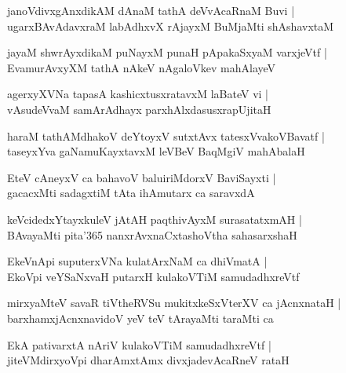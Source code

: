\documentclass[twoside,12pt,openright]{book}
\newcounter{shloka}[chapter]
\begin{document}
\begin{shloka}%
janoVdivxgAnxdikAM dAnaM tathA deVvAcaRnaM Buvi |\\
ugarxBAvAdavxraM labAdhxvX rAjayxM BuMjaMti shAshavxtaM 
\end{shloka}

\begin{shloka}%
jayaM shwrAyxdikaM puNayxM punaH pApakaSxyaM varxjeVtf |\\
EvamurAvxyXM tathA nAkeV nAgaloVkev mahAlayeV 
\end{shloka}

\begin{shloka}%
agerxyXVNa tapasA kashicxtusxratavxM laBateV vi |\\
vAsudeVvaM samArAdhayx parxhAlxdasusxrapUjitaH 
\end{shloka}

\begin{shloka}%
haraM tathAMdhakoV deYtoyxV sutxtAvx tatesxVvakoVBavatf |\\
taseyxYva gaNamuKayxtavxM leVBeV BaqMgiV mahAbalaH 
\end{shloka}

\begin{shloka}%
EteV cAneyxV ca bahavoV baluiriMdorxV BaviSayxti |\\
gacacxMti sadagxtiM tAta ihAmutarx ca saravxdA 
\end{shloka}

\begin{shloka}%
keVcidedxYtayxkuleV jAtAH paqthivAyxM surasatatxmAH |\\
BAvayaMti pita\char'365 nanxrAvxnaCxtashoVtha sahasarxshaH
\end{shloka}

\begin{shloka}%
EkeVnApi suputerxVNa kulatArxNaM ca dhiVmatA |\\
EkoVpi veYSaNxvaH putarxH kulakoVTiM samudadhxreVtf 
\end{shloka}

\begin{shloka}%
mirxyaMteV savaR tiVtheRVSu mukitxkeSxVterXV ca jAcnxnataH |\\
barxhamxjAcnxnavidoV yeV teV tArayaMti taraMti ca 
\end{shloka}

\begin{shloka}%
EkA pativarxtA nAriV kulakoVTiM samudadhxreVtf |\\
jiteVMdirxyoVpi dharAmxtAmx divxjadevAcaRneV rataH 
\end{shloka}
\end{document}
